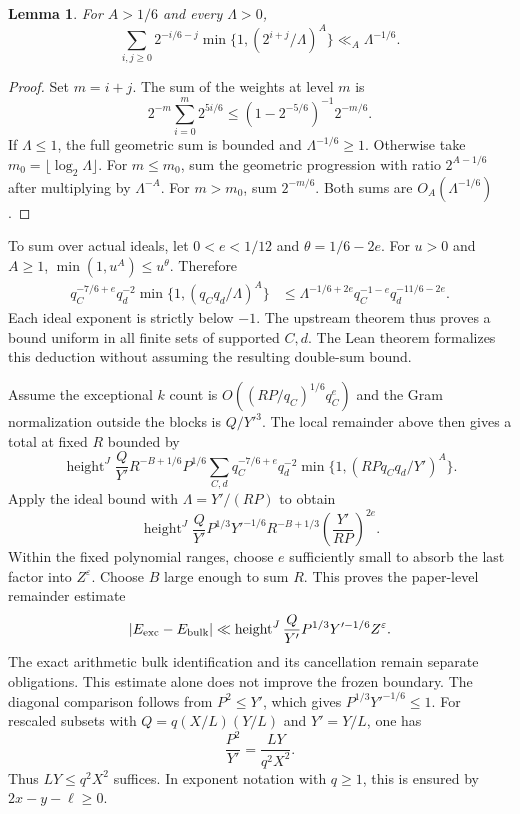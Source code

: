 \documentclass[11pt]{article}
\newtheorem{lemma}{Lemma}
\begin{document}
\begin{lemma}
For $A>1/6$ and every $\Lambda>0$,
\[
 \sum_{i,j\geq0}2^{-i/6-j}
   \min\{1,(2^{i+j}/\Lambda)^A\}\ll_A\Lambda^{-1/6}.
\]
\end{lemma}
\begin{proof}
Set $m=i+j$. The sum of the weights at level $m$ is
\[
 2^{-m}\sum_{i=0}^m2^{5i/6}
 \leq(1-2^{-5/6})^{-1}2^{-m/6}.
\]
If $\Lambda\leq1$, the full geometric sum is bounded and
$\Lambda^{-1/6}\geq1$. Otherwise take $m_0=\lfloor\log_2\Lambda\rfloor$.
For $m\leq m_0$, sum the geometric progression with ratio
$2^{A-1/6}$ after multiplying by $\Lambda^{-A}$. For $m>m_0$, sum
$2^{-m/6}$. Both sums are $O_A(\Lambda^{-1/6})$.
\end{proof}

To sum over actual ideals, let $0<e<1/12$ and
$\theta=1/6-2e$. For $u>0$ and $A\geq1$,
$\min(1,u^A)\leq u^\theta$. Therefore
\begin{align*}
 q_C^{-7/6+e}q_d^{-2}\min\{1,(q_Cq_d/\Lambda)^A\}
 &\leq\Lambda^{-1/6+2e}
   q_C^{-1-e}q_d^{-11/6-2e}.
\end{align*}
Each ideal exponent is strictly below $-1$. The upstream
 theorem thus proves a bound
uniform in all finite sets of supported $C,d$. The Lean theorem
 formalizes
this deduction without assuming the resulting double-sum bound.

Assume the exceptional $k$ count is
$O((RP/q_C)^{1/6}q_C^e)$ and the Gram normalization outside the
blocks is $Q/Y'^3$. The local remainder above then gives a total at
fixed $R$ bounded by
\[
 \operatorname{height}^J\frac Q{Y'}R^{-B+1/6}P^{1/6}
 \sum_{C,d}q_C^{-7/6+e}q_d^{-2}
   \min\{1,(RPq_Cq_d/Y')^A\}.
\]
Apply the ideal bound with $\Lambda=Y'/(RP)$ to obtain
\[
 \operatorname{height}^J\frac Q{Y'}P^{1/3}Y'^{-1/6}
 R^{-B+1/3}\left(\frac{Y'}{RP}\right)^{2e}.
\]
Within the fixed polynomial ranges, choose $e$ sufficiently small
to absorb the last factor into $Z^\varepsilon$. Choose $B$ large
enough to sum $R$. This proves the paper-level remainder estimate
\[
 |E_{\rm exc}-E_{\rm bulk}|\ll
 \operatorname{height}^J\frac Q{Y'}P^{1/3}Y'^{-1/6}Z^\varepsilon.
\]
The exact arithmetic bulk identification and its cancellation remain
separate obligations. This estimate alone does not improve the
frozen boundary. The diagonal comparison follows from $P^2\leq Y'$,
which gives $P^{1/3}Y'^{-1/6}\leq1$. For rescaled subsets with
$Q=q(X/L)(Y/L)$ and $Y'=Y/L$, one has
\[
 \frac{P^2}{Y'}=\frac{LY}{q^2X^2}.
\]
Thus $LY\leq q^2X^2$ suffices. In exponent notation with
$q\geq1$, this is ensured by $2x-y-\ell\geq0$.
\end{document}
